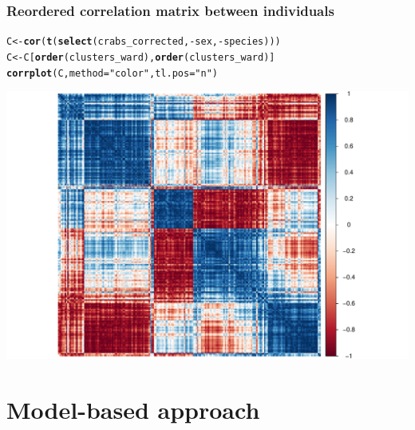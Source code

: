 \documentclass{beamer}\usepackage[]{graphicx}\usepackage[]{color}
\makeatletter
\newcommand{\hlstr}[1]{\textcolor[rgb]{0.192,0.494,0.8}{#1}}%
\newcommand{\hlopt}[1]{\textcolor[rgb]{0,0,0}{#1}}%
\newcommand{\hlstd}[1]{\textcolor[rgb]{0.345,0.345,0.345}{#1}}%
\newcommand{\hlkwb}[1]{\textcolor[rgb]{0.69,0.353,0.396}{#1}}%
\newcommand{\hlkwc}[1]{\textcolor[rgb]{0.333,0.667,0.333}{#1}}%
\newcommand{\hlkwd}[1]{\textcolor[rgb]{0.737,0.353,0.396}{\textbf{#1}}}%
\newenvironment{kframe}{%
 \def\at@end@of@kframe{}%
 \ifinner\ifhmode%
  \def\at@end@of@kframe{\end{minipage}}%
  \begin{minipage}{\columnwidth}%
 \fi\fi%
 \def\FrameCommand##1{\hskip\@totalleftmargin \hskip-\fboxsep
 \colorbox{shadecolor}{##1}\hskip-\fboxsep
     \hskip-\linewidth \hskip-\@totalleftmargin \hskip\columnwidth}%
 \MakeFramed {\advance\hsize-\width
   \@totalleftmargin\z@ \linewidth\hsize
   \@setminipage}}%
 {\par\unskip\endMakeFramed%
 \at@end@of@kframe}
\newenvironment{knitrout}{}{} %
\makeatother
\begin{document}
\begin{frame}[fragile]
  \frametitle{Reordered correlation matrix between individuals}
  
\begin{knitrout}\scriptsize
{}\color{fgcolor}\begin{kframe}
\begin{alltt}
\hlstd{C} \hlkwb{<-} \hlkwd{cor}\hlstd{(}\hlkwd{t}\hlstd{(}\hlkwd{select}\hlstd{(crabs_corrected,} \hlopt{-}\hlstd{sex,} \hlopt{-}\hlstd{species)))}
\hlstd{C} \hlkwb{<-} \hlstd{C[}\hlkwd{order}\hlstd{(clusters_ward),}\hlkwd{order}\hlstd{(clusters_ward)]}
  \hlkwd{corrplot}\hlstd{(C,} \hlkwc{method} \hlstd{=} \hlstr{"color"}\hlstd{,} \hlkwc{tl.pos} \hlstd{=} \hlstr{"n"}\hlstd{)}
\end{alltt}
\end{kframe}
\includegraphics[width=.8\textwidth]{figures/Ward_corrplot-1} 

\end{knitrout}
  

\end{frame}

\section{Model-based approach}
\end{document}
